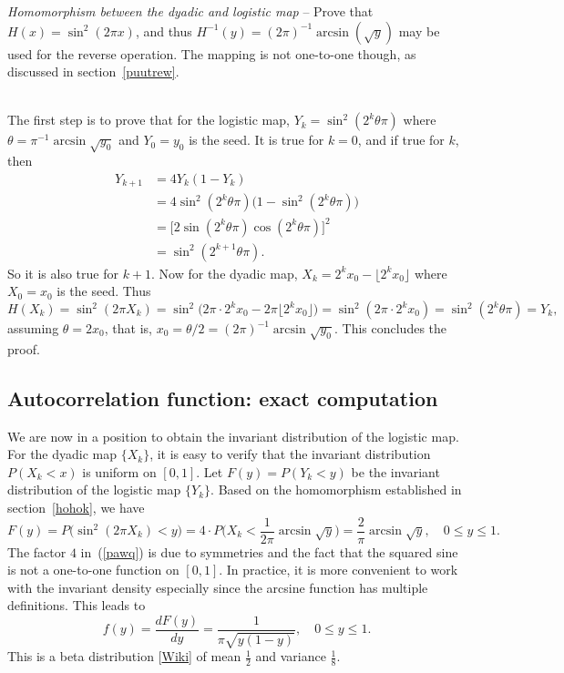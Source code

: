 \documentclass[oneside,10pt]{book}
\newcommand{\qed}{\nobreak \ifvmode \relax \else
      \ifdim\lastskip<1.5em \hskip-\lastskip
      \hskip1.5em plus0em minus0.5em \fi \nobreak
      \vrule height0.75em width0.5em depth0.25em\fi}
\begin{document}
\begin{Exercise}\label{exlm3} {\em Homomorphism between the dyadic and logistic map} -- Prove that  $H(x) =  \sin^2(2\pi x)$, and thus $H^{-1}(y) = (2 \pi)^{-1}\arcsin(\sqrt{y})$ may be used for the reverse operation. The mapping
 is not one-to-one though, as discussed in section~\ref{puutrew}. 
\vspace{1ex}

 \\
The first step is to prove that for the logistic map, $Y_k=\sin^2(2^k\theta\pi)$ where $\theta= \pi^{-1}\arcsin\sqrt{y_0}$
and $Y_0=y_0$ is the seed. It is true for $k=0$, and if true for $k$, then 
\begin{align}
Y_{k+1} & = 4Y_{k}(1-Y_{k})  \nonumber \\
      & = 4 \sin^2(2^{k}\theta\pi)\Big(1 - \sin^2(2^{k}\theta\pi)\Big) \nonumber \\
      & =  \Big[2\sin(2^k\theta\pi)\cos(2^k\theta\pi)\Big]^2 \nonumber \\
     & = \sin^2(2^{k+1}\theta\pi). \nonumber
\end{align}
So it is also true for $k+1$. Now for the dyadic map, 
$X_k = 2^k x_0 - \lfloor 2^k x_0\rfloor$ where $X_0=x_0$ is the seed. Thus 
$$H(X_k)=\sin^2(2\pi X_k)=\sin^2\Big(2\pi\cdot  2^k x_0 -2\pi\lfloor 2^k x_0\rfloor\Big) = \sin^2(2\pi \cdot 2^k x_0)=\sin^2(2^k\theta\pi) = Y_k,
$$
assuming $\theta=2x_0$,  that is,  $x_0 = \theta/2 = (2\pi)^{-1}\arcsin\sqrt{y_0}$. This concludes the proof. \qed
\end{Exercise}


\subsection{Autocorrelation function: exact computation}\label{cxcdsojhg}
 

We are now in a position to obtain the invariant distribution of the logistic map. For the dyadic map $\{X_k\}$, it is easy to verify that the
 invariant distribution $P(X_k < x)$ is uniform on $[0,1]$. Let $F(y) = P(Y_k <y)$ be the invariant
 distribution of the logistic map $\{Y_k\}$. Based on the homomorphism established in section~\ref{hohok}, we have
\begin{equation}
F(y)  = P\Big(\sin^2(2\pi X_k) < y\Big) = 4 \cdot P\Big(X_k< \frac{1}{2\pi}\arcsin\sqrt{y}\Big)
 = \frac{2}{\pi}\arcsin\sqrt{y}, \quad 0\leq y \leq 1.\label{pawq}
\end{equation}
The factor $4$ in~(\ref{pawq}) is due to symmetries and the fact that the squared sine is not
 a one-to-one function on $[0, 1]$. In practice, it is more convenient to work with
the invariant density especially since the arcsine function has multiple definitions. This leads to
\begin{equation}
f(y)=\frac{dF(y)}{dy} = \frac{1}{\pi \sqrt{y(1-y)}}, \quad 0\leq y \leq 1.  \label{logdfs} 
\end{equation}
This is a \textcolor{index}{beta distribution} [\href{https://en.wikipedia.org/wiki/Beta_distribution}{Wiki}] of mean $\frac{1}{2}$ and variance $\frac{1}{8}$.
\end{document}
